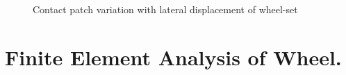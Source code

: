 \documentclass[]{interact}
\theoremstyle{plain}%
\theoremstyle{definition}
\theoremstyle{remark}
\begin{document}
\begin{figure}
\centering
{}
\caption{Contact patch variation with lateral displacement of wheel-set}
\label{fig:Contactpatch}
\end{figure}

\section{Finite Element Analysis of Wheel.}
\end{document}
